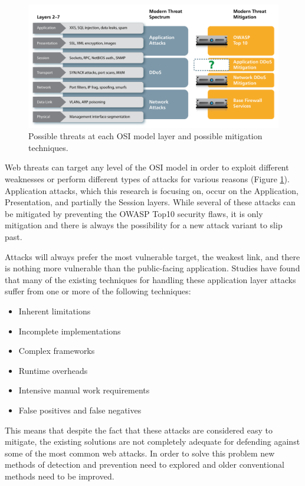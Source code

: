 \begin{figure}
	\label{fig:osithreats}
	\includegraphics[width=450px]{./assets/img/osithreats.png}
	\caption{Possible threats at each OSI model layer and possible mitigation techniques.}
\end{figure}

Web threats can target any level of the OSI model in order to exploit different weaknesses or perform different types of attacks for various reasons (Figure \ref{fig:osithreats}).  Application attacks, which this research is focusing on, occur on the Application, Presentation, and partially the Session layers.  While several of these attacks can be mitigated by preventing the OWASP Top10 security flaws, it is only mitigation and there is always the possibility for a new attack variant to slip past.

Attacks will always prefer the most vulnerable target, the weakest link, and there is nothing more vulnerable than the public-facing application.  Studies have found that many of the existing techniques for handling these application layer attacks suffer from one or more of the following techniques:

\begin{itemize}
	\item Inherent limitations
	\item Incomplete implementations
	\item Complex frameworks
	\item Runtime overheads
	\item Intensive manual work requirements
	\item False positives and false negatives
\end{itemize}
This means that despite the fact that these attacks are considered easy to mitigate, the existing solutions are not completely adequate for defending against some of the most common web attacks.  In order to solve this problem new methods of detection and prevention need to explored and older conventional methods need to be improved.

